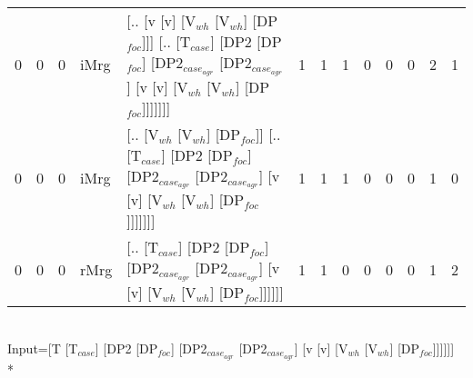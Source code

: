 \begin{tabularx}{\linewidth}{rrrlXrrrrrrrr}
   0 &       0 &   0 & iMrg & [.. [v [v] [V$_{wh}$ [V$_{wh}$] [DP$_{foc}$]]] [.. [T$_{case}$] [DP2 [DP$_{foc}$] [DP2$_{case_{agr}}$ [DP2$_{case_{agr}}$] [v [v] [V$_{wh}$ [V$_{wh}$] [DP$_{foc}$]]]]]]]                                              &             1 &             1 &            1 &              0 &             0 &              0 &          2 &        1 \\
   0 &       0 &   0 & iMrg & [.. [V$_{wh}$ [V$_{wh}$] [DP$_{foc}$]] [.. [T$_{case}$] [DP2 [DP$_{foc}$] [DP2$_{case_{agr}}$ [DP2$_{case_{agr}}$] [v [v] [V$_{wh}$ [V$_{wh}$] [DP$_{foc}$]]]]]]]                                                      &             1 &             1 &            1 &              0 &             0 &              0 &          1 &        0 \\
   0 &       0 &   0 & rMrg & [.. [T$_{case}$] [DP2 [DP$_{foc}$] [DP2$_{case_{agr}}$ [DP2$_{case_{agr}}$] [v [v] [V$_{wh}$ [V$_{wh}$] [DP$_{foc}$]]]]]]                                                                                  &             1 &             1 &            0 &              0 &             0 &              0 &          1 &        2 \\
\hline
\end{tabularx}\endgroup\\
\begingroup\scriptsize Input=[T [T$_{case}$] [DP2 [DP$_{foc}$] [DP2$_{case_{agr}}$ [DP2$_{case_{agr}}$] [v [v] [V$_{wh}$ [V$_{wh}$] [DP$_{foc}$]]]]]]\\*

